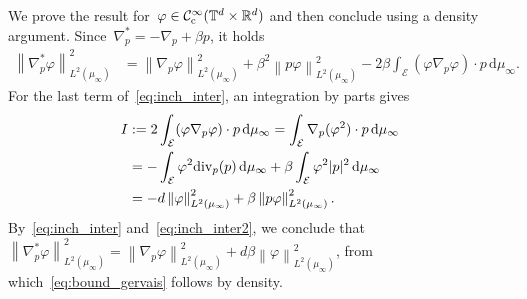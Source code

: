 \documentclass[onefignum,onetabnum]{siamart251216} %
\renewcommand{\d}{\mathrm{d}}
\newcommand{\norm}[1]{\left\lVert#1\right\rVert}
\newcommand{\torus}{\mathbb T}
\newcommand{\real}{\mathbb R}
\newcommand{\mc}[1]{\mathcal{#1}}
\newcommand{\mescin}{\mu}
\newcommand{\mesvit}{\kappa}
\newcommand{\emfq}{\widetilde{E}_{\mathrm{MF}}}
\newcommand{\EngCinMF}{\Theta_{\mathrm{MF}}}
\newcommand{\emff}[1]{E_{\mathrm{MF}}\!\left[#1\right]}
\newcommand{\projp}{\Pi}
\newcommand{\norml}[1]{\norm{#1}_{L^2(\mescin_\infty)}}
\theoremstyle{plain}
\numberwithin{equation}{section}
\numberwithin{theorem}{section}
\begin{document}
\label{ann:proof_grap_star}
We prove the result for~$\varphi\in\mc{C}_{\rm c}^\infty(\torus^d \times \real^d)$ and then conclude using a density argument.
Since~$\nabla_p^* = -\nabla_p + \beta p$, it holds
\begin{align}
    \norml{\nabla_p^* \varphi}^2 &= \norml{\nabla_p \varphi}^2 + \beta^2\norml{p \varphi}^2 - 2\beta \int_{\mc{E}}(\varphi\nabla_p\varphi)\cdot p\,\d \mescin_\infty.
    \label{eq:inch_inter}
\end{align}
For the last term of~\eqref{eq:inch_inter},
an integration by parts gives
\begin{align}
    \notag
    I &:= 2\int_{\mc{E}}(\varphi\nabla_p\varphi)\cdot p\,\d \mescin_\infty
     = \int_{\mc{E}}\nabla_p(\varphi^2)\cdot p \, \d \mescin_\infty \\
     \notag
     &= - \int_{\mc{E}}\varphi^2 \text{div}_p(p)\, \d \mescin_\infty + \beta\int_{\mc{E}}\varphi^2 |p|^2 \, \d \mescin_\infty \\
     \label{eq:inch_inter2}
     &= -d\norml{\varphi}^2 +\beta\norml{p \varphi}^2.
\end{align}
By~\eqref{eq:inch_inter} and~\eqref{eq:inch_inter2}, we conclude that $\norml{\nabla_p^* \varphi}^2 = \norml{\nabla_p \varphi}^2 + d\beta \norml{\varphi}^2$, from which~\eqref{eq:bound_gervais} follows by density.
\end{document}
